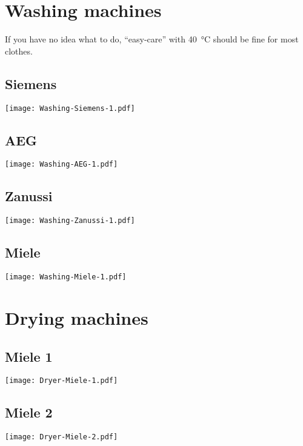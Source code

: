 \documentclass[11pt, english, fleqn, DIV=15, headinclude]{scrartcl}
\title{}
\author{
    Martin Ueding \\ \small{\href{mailto:mu@martin-ueding.de}{mu@martin-ueding.de}}
}
\begin{document}
\section*{Washing machines}

If you have no idea what to do, “easy-care” with \SI{40}{\celsius} should be
fine for most clothes.

\subsection*{Siemens}
\texttt{[image: Washing-Siemens-1.pdf]}

\subsection*{AEG}
\texttt{[image: Washing-AEG-1.pdf]}

\subsection*{Zanussi}
\texttt{[image: Washing-Zanussi-1.pdf]}

\subsection*{Miele}
\texttt{[image: Washing-Miele-1.pdf]}

\section*{Drying machines}

\subsection*{Miele 1}

\texttt{[image: Dryer-Miele-1.pdf]}

\subsection*{Miele 2}

\texttt{[image: Dryer-Miele-2.pdf]}
\end{document}
